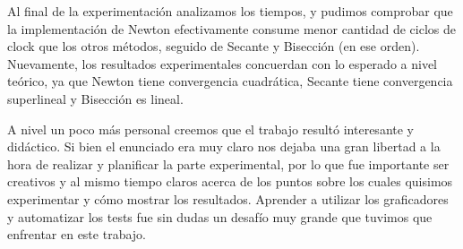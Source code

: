 Al final de la experimentación analizamos los tiempos, y pudimos comprobar que la implementación de Newton efectivamente consume menor cantidad de ciclos de clock que los otros métodos, seguido de Secante 
y Bisección (en ese orden). Nuevamente, los resultados experimentales concuerdan con lo esperado a nivel teórico, ya que Newton tiene convergencia cuadrática, Secante tiene convergencia superlineal y Bisección
es lineal.

A nivel un poco más personal creemos que el trabajo resultó interesante y didáctico. Si bien el enunciado era muy claro nos dejaba una gran libertad a la hora de realizar y planificar la parte experimental,
por lo que fue importante ser creativos y al mismo tiempo claros acerca de los puntos sobre los cuales quisimos experimentar y cómo mostrar los resultados. Aprender a utilizar los graficadores y automatizar
los tests fue sin dudas un desafío muy grande que tuvimos que enfrentar en este trabajo.